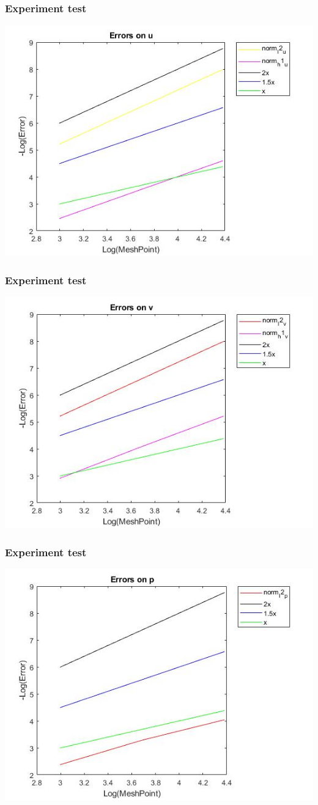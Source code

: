 \documentclass[11pt]{beamer}
\numberwithin{equation}{section}
\theoremstyle{plain}
\theoremstyle{definition}
\theoremstyle{remark}
\begin{document}
\begin{frame}\frametitle{Experiment test}
\includegraphics[scale=0.5]{3}
\end{frame}
\begin{frame}\frametitle{Experiment test}
\includegraphics[scale=0.5]{4}
\end{frame}
\begin{frame}\frametitle{Experiment test}
\includegraphics[scale=0.5]{5}
\end{frame}
\end{document}
